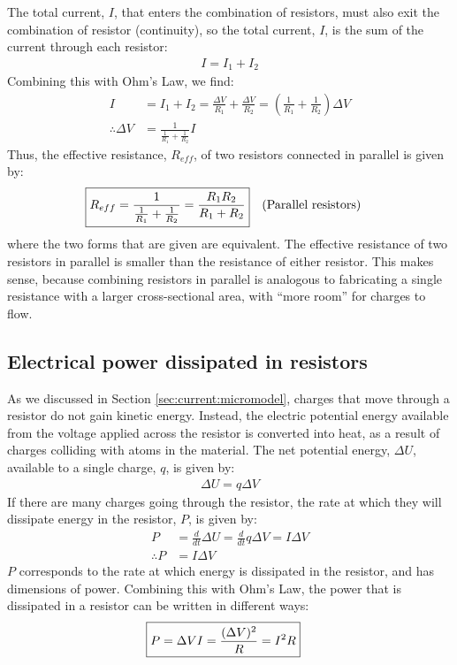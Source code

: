 The total current, $I$, that enters the combination of resistors, must also exit the combination of resistor (continuity), so the total current, $I$, is the sum of the current through each resistor:
\begin{align*}
I=I_1+I_2
\end{align*}
Combining this with Ohm's Law, we find:
\begin{align*}
I&=I_1+I_2=\frac{\Delta V}{R_1}+\frac{\Delta V}{R_2}=\left( \frac{1}{R_1}+\frac{1}{R_2} \right)\Delta V\\
\therefore \Delta V &= \frac{1}{\frac{1}{R_1}+\frac{1}{R_2}}I
\end{align*}
Thus, the effective resistance, $R_{eff}$, of two resistors connected in parallel is given by:
\begin{align*}
\Aboxed{R_{eff}=\frac{1}{\frac{1}{R_1}+\frac{1}{R_2}}=\frac{R_1R_2}{R_1+R_2}}\quad \text{(Parallel resistors)}
\end{align*}
where the two forms that are given are equivalent. The effective resistance of two resistors in parallel is smaller than the resistance of either resistor. This makes sense, because combining resistors in parallel is analogous to fabricating a single resistance with a larger cross-sectional area, with ``more room'' for charges to flow.

\subsection{Electrical power dissipated in resistors}
As we discussed in Section \ref{sec:current:micromodel}, charges that move through a resistor do not gain kinetic energy. Instead, the electric potential energy available from the voltage applied across the resistor is converted into heat, as a result of charges colliding with atoms in the material. The net potential energy, $\Delta U$, available to a single charge, $q$, is given by:
\begin{align*}
\Delta U=q\Delta V
\end{align*}
If there are many charges going through the resistor, the rate at which they will dissipate energy in the resistor, $P$, is given by:
\begin{align*}
P&=\frac{d}{dt}\Delta U=\frac{d}{dt}q\Delta V=I\Delta V\\
\therefore P&=I\Delta V
\end{align*}
$P$ corresponds to the rate at which energy is dissipated in the resistor, and has dimensions of power. Combining this with Ohm's Law, the power that is dissipated in a resistor can be written in different ways:
\begin{align*}
\Aboxed{P=\Delta V I=\frac{(\Delta V)^2}{R}=I^2R}
\end{align*}

